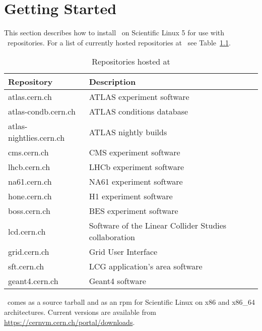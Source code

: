 \chapter{Getting Started}
\label{sct:start}

This section describes how to install \cvmfs\ on Scientific Linux 5 for use with \cernvm\ repositories.
For a list of currently hosted repositories at \cern\ see Table~\ref{tbl:repos}.
\begin{table}[t]
	\begin{center}
		\begin{tabular}{l|l}
			\bf Repository & \bf Description \\\hline
			atlas.cern.ch & ATLAS experiment software \\
			atlas-condb.cern.ch & ATLAS conditions database \\
			atlas-nightlies.cern.ch & ATLAS nightly builds \\
			cms.cern.ch & CMS experiment software \\
			lhcb.cern.ch & LHCb experiment software \\
			na61.cern.ch & NA61 experiment software \\
			hone.cern.ch & H1 experiment software \\
			boss.cern.ch & BES experiment software \\
			lcd.cern.ch & Software of the Linear Collider Studies collaboration \\
			grid.cern.ch & Grid User Interface \\
			sft.cern.ch & LCG application's area software \\
			geant4.cern.ch & Geant4 software \\ 
		\end{tabular}
	\end{center}
	\caption{Repositories hosted at \cern}
	\label{tbl:repos}
\end{table}
\cvmfs\ comes as a source tarball and as an rpm for Scientific Linux on x86 and x86\_64 architectures.
Current versions are available from \url{https://cernvm.cern.ch/portal/downloads}.

